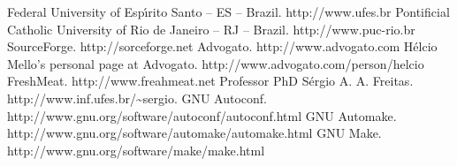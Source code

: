 \documentclass[a4paper,draft,12pt]{book}
\begin{document}
\begin{thebibliography}{12}
 Federal University of Esp\'{\i}rito Santo -- ES -- Brazil.
http://www.ufes.br
 Pontificial Catholic University of Rio de Janeiro -- RJ
-- Brazil. http://www.puc-rio.br
 SourceForge. http://sorceforge.net
Advogato. http://www.advogato.com
H\'elcio Mello's personal page at Advogato.
http://www.advogato.com/person/helcio
FreshMeat. http://www.freahmeat.net
Professor PhD S\'ergio A. A. Freitas.
http://www.inf.ufes.br/\~{}sergio.
GNU Autoconf.
http://www.gnu.org/software/autoconf/autoconf.html
GNU Automake.
http://www.gnu.org/software/automake/automake.html
GNU Make. http://www.gnu.org/software/make/make.html
\end{thebibliography}
\end{document}
